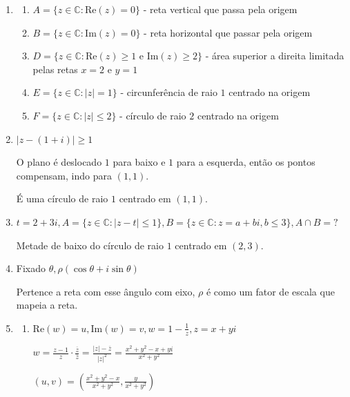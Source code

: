 \documentclass[12pt, openright, a4paper, twoside, english, brazil]{article}
\newenvironment{qitem}{
  \color{black}
\item}{\vspace{10pt}}
\newenvironment{qmitem}{
  \color{black}
\item
\begin{enumerate}[\bfseries a)]}{
\end{enumerate}\vspace{10pt}}
\newcommand{\cis}[1]{\displaystyle(\cos#1+i\sin#1)}
\begin{document}
\begin{enumerate}[\bfseries 1.]
  \begin{qmitem} %
  \item $A=\{z\in\mathbb C:\text{Re}(z)=0\}${\color{red} - reta
    vertical que passa pela origem}
  \item $B=\{z\in\mathbb C:\text{Im}(z)=0\}${\color{red} - reta
    horizontal que passar pela origem}
  \item $D=\{z\in\mathbb C:\text{Re}(z)\ge1\text{ e
    }\text{Im}(z)\ge2\}${\color{red} - área superior a direita
    limitada pelas retas $x=2$ e $y=1$}
  \item $E=\{z\in\mathbb C:|z|=1\}${\color{red} - circunferência de
    raio $1$ centrado na origem}
  \item $F=\{z\in\mathbb C:|z|\le2\}${\color{red} - círculo de raio
    $2$ centrado na origem}
  \end{qmitem}

  \begin{qitem} %
    $|z-(1+i)|\ge1$

    \color{red}
    O plano é deslocado $1$ para baixo e $1$ para a esquerda, então
    os pontos compensam, indo para $(1,1)$.

    É uma círculo de raio $1$ centrado em $(1,1)$.
  \end{qitem}

  \begin{qitem} %
    $t=2+3i, A=\{z\in\mathbb C:|z-t|\le1\}, B=\{z\in\mathbb
    C:z=a+bi,b\le3\}, A\cap B=?$

    \color{red}
    Metade de baixo do círculo de raio $1$ centrado em $(2,3)$.
  \end{qitem}

  \begin{qitem} %
    Fixado $\theta, \rho\cis\theta$

    \color{red}
    Pertence a reta com esse ângulo com eixo, $\rho$ é como um fator
    de escala que mapeia a reta.
  \end{qitem}

  \begin{qmitem} %
  \item $\displaystyle\text{Re}(w)=u,\text{Im}(w)=v, w=1-\frac1z,z=x+yi$

    \color{red}
    $\displaystyle w=\frac{z-1}{z}\cdot\frac{\overline z}{\overline
    z}=\frac{|z|-\overline z}{|z|^2}=\frac{x^2+y^2-x+yi}{x^2+y^2}$

    $\displaystyle
    (u,v)=\left(\frac{x^2+y^2-x}{x^2+y^2},\frac{y}{x^2+y^2}\right)$
    \color{black}


\end{qmitem}
\end{enumerate}
\end{document}
